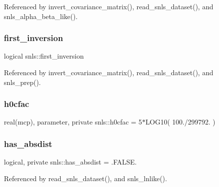 Referenced by invert\+\_\+covariance\+\_\+matrix(), read\+\_\+snls\+\_\+dataset(), and snls\+\_\+alpha\+\_\+beta\+\_\+like().

\mbox{\label{namespacesnls_a40ca845281c24a135e23e1a160610163}} 
\subsubsection{\texorpdfstring{first\+\_\+inversion}{first\_inversion}}
{\footnotesize\ttfamily logical snls\+::first\+\_\+inversion\hspace{0.3cm}{\ttfamily [private]}}



Referenced by invert\+\_\+covariance\+\_\+matrix(), read\+\_\+snls\+\_\+dataset(), and snls\+\_\+prep().

\mbox{\label{namespacesnls_ae1879f7b41dc92841a8396c15ed20751}} 
\subsubsection{\texorpdfstring{h0cfac}{h0cfac}}
{\footnotesize\ttfamily real(mcp), parameter, private snls\+::h0cfac = 5$\ast$L\+O\+G10( 100./299792. )\hspace{0.3cm}{\ttfamily [private]}}

\mbox{\label{namespacesnls_ac58c726d5874a3387309a8b805bfecee}} 
\subsubsection{\texorpdfstring{has\+\_\+absdist}{has\_absdist}}
{\footnotesize\ttfamily logical, private snls\+::has\+\_\+absdist = .F\+A\+L\+S\+E.\hspace{0.3cm}{\ttfamily [private]}}



Referenced by read\+\_\+snls\+\_\+dataset(), and snls\+\_\+lnlike().

\mbox{\label{namespacesnls_aa953f2792677b7c901fc89bebdd40c36}} 
